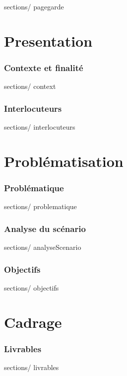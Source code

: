 \documentclass[french, 11pt, a4paper]{article}
\begin{document}
\thispagestyle {plain}

 {sections/} {pagegarde}
\newpage

\tableofcontents
\newpage



\part {Presentation}
\section {Contexte et finalité}
 {sections/} {context}

\section {Interlocuteurs}
 {sections/} {interlocuteurs}



\newpage
\part {Problématisation}

\section {Problématique}
 {sections/} {problematique}

\section {Analyse du scénario}
 {sections/} {analyseScenario}

\section {Objectifs}
 {sections/} {objectifs}



\newpage
\part {Cadrage}

\section {Livrables}
 {sections/} {livrables}
\end{document}
